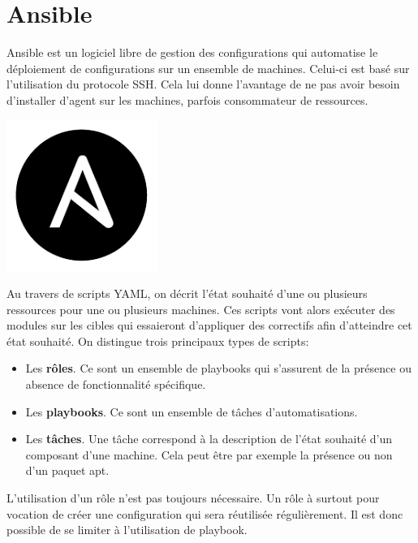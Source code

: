 \documentclass[12pt, a4paper, twoside]{article}
\begin{document}
\section{Ansible}
\noindent%
\begin{minipage}{.8\textwidth}%
\gls{Ansible} est un logiciel libre de gestion des configurations qui automatise le déploiement de configurations sur un ensemble de machines. 
Celui-ci est basé sur l'utilisation du protocole SSH. 
Cela lui donne l'avantage de ne pas avoir besoin d'installer d'agent sur les machines, parfois consommateur de ressources. \\

\end{minipage}%
\hfill
\begin{minipage}{.2\textwidth}%
\begin{center}
\includegraphics[scale=0.3]{src/logo_ansible.png}
\end{center}
\end{minipage}%

Au travers de scripts YAML, on décrit l'état souhaité d'une ou plusieurs ressources pour une ou plusieurs machines. 
Ces scripts vont alors exécuter des modules sur les cibles qui essaieront d'appliquer des correctifs afin d'atteindre cet état souhaité. 
On distingue trois principaux types de scripts:
\begin{itemize}
    \item Les \textbf{rôles}. Ce sont un ensemble de playbooks qui s'assurent de la présence ou absence de fonctionnalité spécifique.
    \item Les \textbf{playbooks}. Ce sont un ensemble de tâches d'automatisations.
    \item Les \textbf{tâches}. Une tâche correspond à la description de l'état souhaité d'un composant d'une machine. 
    Cela peut être par exemple la présence ou non d'un paquet apt.
\end{itemize}

L'utilisation d'un rôle n'est pas toujours nécessaire. 
Un rôle à surtout pour vocation de créer une configuration qui sera réutilisée régulièrement. 
Il est donc possible de se limiter à l'utilisation de playbook. \\
\end{document}
